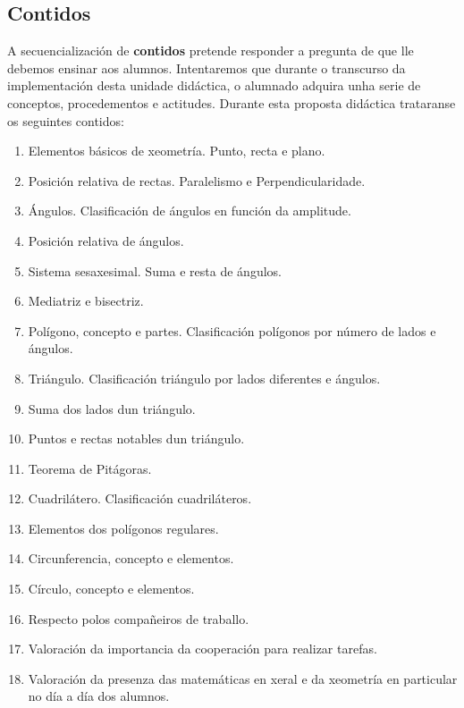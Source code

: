 \subsection{Contidos}
A secuencialización de \textbf{contidos} pretende responder a pregunta de que lle debemos ensinar aos alumnos. Intentaremos que durante o transcurso da implementación desta unidade didáctica, o alumnado adquira unha serie de conceptos, procedementos e actitudes. Durante esta proposta didáctica trataranse os seguintes contidos:

\begin{enumerate}[label=\bfseries Con\arabic*]
  \item\label{con1} Elementos básicos de xeometría. Punto, recta e plano.
  \item\label{con2} Posición relativa de rectas. Paralelismo e Perpendicularidade.
  \item\label{con3} Ángulos. Clasificación de ángulos en función da amplitude.
  \item\label{con4} Posición relativa de ángulos.
  \item\label{con5} Sistema sesaxesimal. Suma e resta de ángulos.
  \item\label{con6} Mediatriz e bisectriz.
  \item\label{con7} Polígono, concepto e partes. Clasificación polígonos por número de lados e ángulos.
  \item\label{con8} Triángulo. Clasificación triángulo por lados diferentes e ángulos.
  \item\label{con9} Suma dos lados dun triángulo.
  \item\label{con10} Puntos e rectas notables dun triángulo.
  \item\label{con11} Teorema de Pitágoras.
  \item\label{con12} Cuadrilátero. Clasificación cuadriláteros.
  \item\label{con13} Elementos dos polígonos regulares.
  \item\label{con14} Circunferencia, concepto e elementos.
  \item\label{con15} Círculo, concepto e elementos.
  \item\label{con16} Respecto polos compañeiros de traballo.
  \item\label{con16} Valoración da importancia da cooperación para realizar tarefas.
  \item\label{con17} Valoración da presenza das matemáticas en xeral e da xeometría en particular no día a día dos alumnos.
\end{enumerate}

